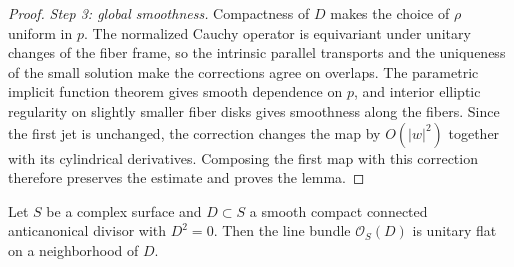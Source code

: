 \begin{proof}
\emph{Step 3: global smoothness.} Compactness of $D$ makes the choice of $\rho$ uniform in $p$. The normalized Cauchy operator is equivariant under unitary changes of the fiber frame, so the intrinsic parallel transports and the uniqueness of the small solution make the corrections agree on overlaps. The parametric implicit function theorem gives smooth dependence on $p$, and interior elliptic regularity on slightly smaller fiber disks gives smoothness along the fibers. Since the first jet is unchanged, the correction changes the map by $O(|w|^2)$ together with its cylindrical derivatives. Composing the first map with this correction therefore preserves the estimate and proves the lemma.
\end{proof}

\begin{theorem}\label{thm:flat-anticanonical-neighborhood}
Let $S$ be a complex surface and $D\subset S$ a smooth compact connected anticanonical divisor with $D^2=0$. Then the line bundle $\mathcal O_S(D)$ is unitary flat on a neighborhood of $D$.
\end{theorem}
